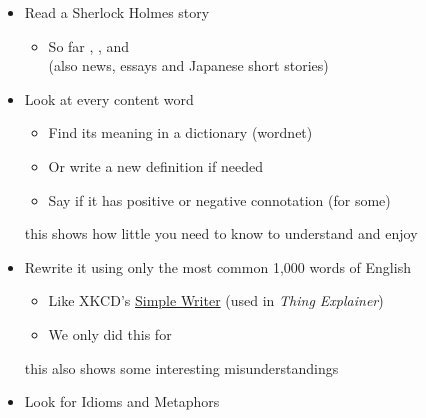 \documentclass[a4paper,landscape,headrule,footrule,xetex]{foils}
\begin{document}
\begin{itemize}\addtolength{\itemsep}{-1ex}
\item Read a Sherlock Holmes story
  \begin{itemize}
  \item  So far , ,  and 
\\ (also news, essays and Japanese short stories)
  \end{itemize}
\item Look at every content word
  \begin{itemize}
  \item Find its meaning in a dictionary (wordnet)
  \item Or write a new definition if needed
  \item Say if it has positive or negative connotation (for some)
  \end{itemize}
  this shows how little you need to know to understand and enjoy
\item Rewrite it using only the most common 1,000 words of English
  \begin{itemize}
  \item Like XKCD's \href{https://xkcd.com/simplewriter/}{Simple Writer}
    (used in \textit{Thing Explainer})
  \item We only did this for 
  \end{itemize}
  this also shows some interesting misunderstandings
\item Look for Idioms and Metaphors
\end{itemize}



\end{document}
